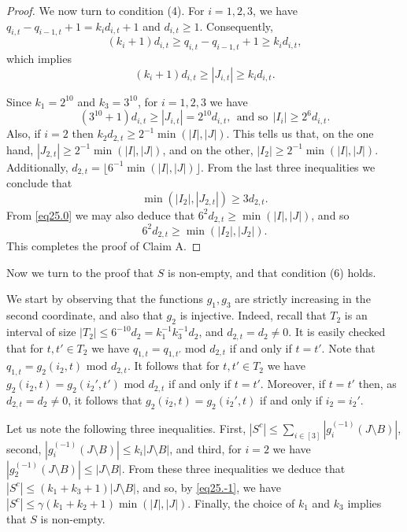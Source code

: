 \documentclass[12pt,reqno]{amsart}
\theoremstyle{definition}
\renewcommand\leq{\leqslant}
\renewcommand\geq{\geqslant}
\begin{document}
\begin{proof}
\vspace{7pt}
We now turn to condition (4). For $i=1,2,3$, we have $q_{i,t}-q_{i-1,t}+1=k_id_{i,t}+1$ and
$d_{i,t} \geq 1$. Consequently,
\[
(k_i+1)d_{i,t}\geq q_{i,t}-q_{i-1,t}+1\geq k_id_{i,t},
\]
which implies
\begin{equation}\label{eq25.29957}
(k_i+1)d_{i,t}\geq|J_{i,t}|\geq k_id_{i,t}.
\end{equation}

\vspace{10pt}
\noindent
Since $k_1=2^{10}$ and $k_3=3^{10}$, for $i=1,2,3$ we have
\[
(3^{10}+1)d_{i,t}\geq |J_{i,t}|=2^{10}d_{i,t}, \ \ \text{and so} \ \ |I_{i}|\geq 2^{6}d_{i,t}.
\]
Also, if $i=2$  then $k_2d_{2,t}\geq 2^{-1}\min(|I|,|J|)$.
This tells us that, on the one hand, $|J_{2,t}|\geq 2^{-1}\min(|I|,|J|)$, and on the other,
$|I_{2}|\geq 2^{-1}\min(|I|,|J|)$.
Additionally, $d_{2,t}=\lfloor 6^{-1}\min(|I|,|J|)\rfloor. $
From the last three inequalities we conclude that
\[
\min(|I_2|,|J_{2,t}|)\geq 3d_{2,t}.
\]
From \eqref{eq25.0} we may also deduce that
$6^2d_{2,t}\geq \min(|I|,|J|)$, and so
\[
6^2d_{2,t}\geq\min(|I_2|,|J_2|).
\]
This completes the proof of Claim A.
\end{proof}

Now we turn to the proof that $S$ is non-empty, and that condition (6) holds.

\vspace{7pt}

We start by observing that the functions $g_1, g_3$ are strictly increasing in the second coordinate, and also that $g_2$ is injective. Indeed,                                   
recall that  $T_2$ is an interval of size $|T_2|\leq 6^{-10}d_2=k_1^{-1}k_3^{-1}d_2$, and $d_{2,t}=d_2 \neq 0$. It is easily checked that for $t,t'\in T_2$ we have                
$q_{1,t}=q_{1,t'} \text{ mod }d_{2,t}$ if and only if $t=t'$.                                                                                                                      
Note that $q_{1,t}=g_2(i_2,t) \text{ mod } d_{2,t}$. It follows that for $t,t'\in T_2$ we have $g_2({i_2,t})=g_2({i_2',t'}) \text{ mod }d_{2,t}$                                   
if and only if $t=t'$. Moreover, if $t=t'$ then, as $d_{2,t}=d_2\neq 0$, it follows that $g_2(i_2,t)=g_2(i_2',t)$ if and only if $i_2=i_2'$.                                      
                                          
Let us note the following three inequalities. First,
$|S^c| \leq \sum_{i\in[3]} |g_i^{(-1)} (J\setminus B)|$,
second, $|g_i^{(-1)} (J\setminus B)| \leq k_i|J\setminus B|$,
and third,  for $i=2$ we have
$|g_2^{(-1)} (J\setminus B)| \leq |J\setminus B|$.
From these three inequalities we deduce that $|S^c|\leq (k_1+k_3+1)|J\setminus B|$,
and so, by \eqref{eq25.-1}, we have
$|S^c|\leq \gamma (k_1+k_2+1) \min(|I|,|J|)$.
Finally, the choice of $k_1$ and $k_3$ implies that $S$ is non-empty.
\end{document}

